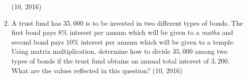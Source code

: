 \begin{enumerate}[label=\thesubsection.\arabic*, ref=\thesubsection.\theenumi]
\hfill (10, 2016)
\item A trust fund has \rupee $35,000$ is to be invested in two different types of bonds. The first bond pays $8\%$ interest per annum which will be given to a {\em matha} and second bond pays $10\%$ interest per annum which will be given to a temple. Using matrix multiplication, determine how to divide \rupee $35,000$ among two types of bonds if the trust fund obtains an annual total interest of \rupee $3,200$. What are the values reflected in this question? 
\hfill (10, 2016)


\end{enumerate}
